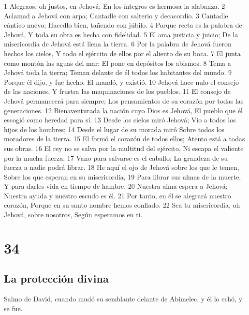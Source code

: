 1 Alegraos, oh justos, en Jehová;
En los íntegros es hermosa la alabanza.
2 Aclamad a Jehová con arpa;
Cantadle con salterio y decacordio.
3 Cantadle cántico nuevo;
Hacedlo bien, tañendo con júbilo.
4 Porque recta es la palabra de Jehová,
Y toda su obra es hecha con fidelidad.
5 El ama justicia y juicio;
De la misericordia de Jehová está llena la tierra.
6 Por la palabra de Jehová fueron hechos los cielos,
Y todo el ejército de ellos por el aliento de su boca.
7 El junta como montón las aguas del mar;
El pone en depósitos los abismos.
8 Tema a Jehová toda la tierra;
Teman delante de él todos los habitantes del mundo.
9 Porque él dijo, y fue hecho;
El mandó, y existió.
10 Jehová hace nulo el consejo de las naciones,
Y frustra las maquinaciones de los pueblos.
11 El consejo de Jehová permanecerá para siempre;
Los pensamientos de su corazón por todas las generaciones.
12 Bienaventurada la nación cuyo Dios es Jehová,
El pueblo que él escogió como heredad para sí.
13 Desde los cielos miró Jehová;
Vio a todos los hijos de los hombres;
14 Desde el lugar de su morada miró
Sobre todos los moradores de la tierra.
15 El formó el corazón de todos ellos;
Atento está a todas sus obras.
16 El rey no se salva por la multitud del ejército,
Ni escapa el valiente por la mucha fuerza.
17 Vano para salvarse es el caballo;
La grandeza de su fuerza a nadie podrá librar.
18 He aquí el ojo de Jehová sobre los que le temen,
Sobre los que esperan en su misericordia,
19 Para librar sus almas de la muerte,
Y para darles vida en tiempo de hambre.
20 Nuestra alma espera a Jehová;
Nuestra ayuda y nuestro escudo es él.
21 Por tanto, en él se alegrará nuestro corazón,
Porque en su santo nombre hemos confiado.
22 Sea tu misericordia, oh Jehová, sobre nosotros,
Según esperamos en ti.

\chapter{34}

\section*{La protección divina}

Salmo de David, cuando mudó su semblante delante de Abimelec,  y él lo echó, y se fue.

